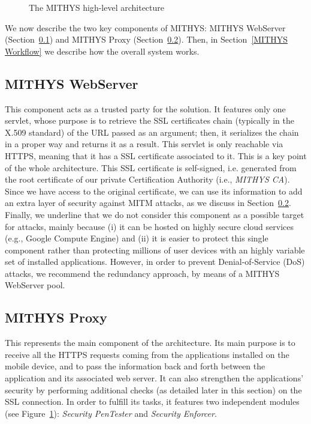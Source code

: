 \documentclass[english]{llncs}
\begin{document}
\begin{figure}[t]
	\centering
	\caption{The MITHYS high-level architecture}
	\label{fig:high_level_architecture}
\end{figure}

We now describe the two key components of MITHYS: MITHYS WebServer (Section~\ref{MITHYS WebServer}) and MITHYS Proxy (Section~\ref{MITHYS Proxy}). Then, in Section~\ref{MITHYS Workflow} we describe how the overall system works.





\subsection{MITHYS WebServer}
\label{MITHYS WebServer}
This component acts as a trusted party for the solution. It features only one servlet, whose purpose is to retrieve the SSL certificates chain (typically in the X.509 standard) of the URL passed as an argument; then, it serializes the chain in a proper way and returns it as a result. This servlet is only reachable via HTTPS, meaning that it has a SSL certificate associated to it. This is a key point of the whole architecture. This SSL certificate is self-signed, i.e. generated from the root certificate of our private Certification Authority (i.e., \textit{MITHYS CA}). Since we have access to the original certificate, we can use its information to add an extra layer of security against MITM attacks, as we discuss in Section~\ref{MITHYS Proxy}. Finally, we underline that we do not consider this component as a possible target for attacks, mainly because (i) it can be hosted on highly secure cloud services (e.g., Google Compute Engine) and (ii) it is easier to protect this single component rather than protecting millions of user devices with an highly variable set of installed applications. However, in order to prevent Denial-of-Service (DoS) attacks, we recommend the redundancy approach, by means of a MITHYS WebServer pool.

\subsection{MITHYS Proxy}
\label{MITHYS Proxy}



This represents the main component of the architecture. Its main purpose is to receive all the HTTPS requests coming from the applications installed on the mobile device, and to pass the information back and forth between the application and its associated web server. It can also strengthen the applications' security by performing additional checks (as detailed later in this section) on the SSL connection. In order to fulfill its tasks, it features two independent modules (see Figure~\ref{fig:high_level_architecture}): \textit{Security PenTester} and \textit{Security Enforcer}.
\end{document}
